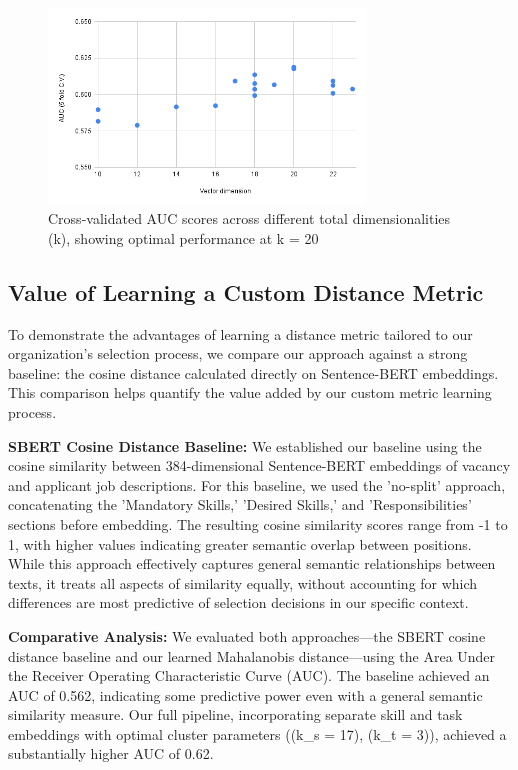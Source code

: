 \begin{figure}[htb]
\centering
\includegraphics[width=0.75\textwidth]{new_img/chart.png}
\caption{Cross-validated AUC scores across different total dimensionalities (k), showing optimal performance at k = 20}
\label{fig:AUC}
\end{figure}

\subsection{Value of Learning a Custom Distance Metric}

To demonstrate the advantages of learning a distance metric tailored to our organization's selection process, 
we compare our approach against a strong baseline: the cosine distance calculated directly on Sentence-BERT 
embeddings. This comparison helps quantify the value added by our custom metric learning process.

\textbf{SBERT Cosine Distance Baseline:} We established our baseline using the cosine similarity between 
384-dimensional Sentence-BERT embeddings of vacancy and applicant job descriptions. For this baseline, 
we used the 'no-split' approach, concatenating the 'Mandatory Skills,' 'Desired Skills,' and 'Responsibilities' 
sections before embedding. The resulting cosine similarity scores range from -1 to 1, with higher values 
indicating greater semantic overlap between positions. While this approach effectively captures general 
semantic relationships between texts, it treats all aspects of similarity equally, without accounting for 
which differences are most predictive of selection decisions in our specific context.

\textbf{Comparative Analysis:} We evaluated both approaches—the SBERT cosine distance baseline and our 
learned Mahalanobis distance—using the Area Under the Receiver Operating Characteristic Curve (AUC). 
The baseline achieved an AUC of 0.562, indicating some predictive power even with a general semantic 
similarity measure. Our full pipeline, incorporating separate skill and task embeddings with optimal 
cluster parameters ((k_s = 17), (k_t = 3)), achieved a substantially higher AUC of 0.62.

